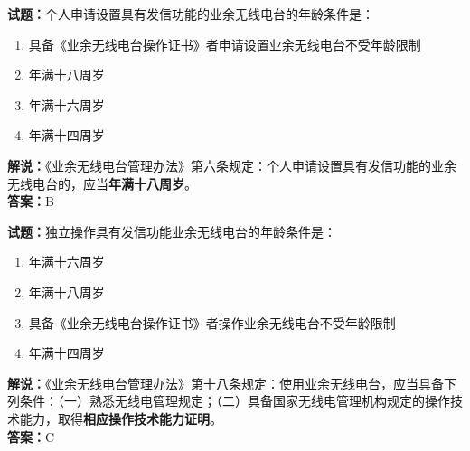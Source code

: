 \documentclass{ctexbook}
\begin{document}
\vspace{\baselineskip}

\noindent\textbf{试题：}个人申请设置具有发信功能的业余无线电台的年龄条件是：
\begin{enumerate}[leftmargin=3em]
  \item 具备《业余无线电台操作证书》者申请设置业余无线电台不受年龄限制
  \item 年满十八周岁
  \item 年满十六周岁
  \item 年满十四周岁
\end{enumerate}
\noindent\textbf{解说：}《业余无线电台管理办法》第六条规定：个人申请设置具有发信功能的业余无线电台的，应当\textbf{年满十八周岁}。\\\noindent\textbf{答案：}B

\vspace{\baselineskip}

\noindent\textbf{试题：}独立操作具有发信功能业余无线电台的年龄条件是：
\begin{enumerate}[leftmargin=3em]
  \item 年满十六周岁
  \item 年满十八周岁
  \item 具备《业余无线电台操作证书》者操作业余无线电台不受年龄限制
  \item 年满十四周岁
\end{enumerate}
\noindent\textbf{解说：}《业余无线电台管理办法》第十八条规定：使用业余无线电台，应当具备下列条件：（一）熟悉无线电管理规定；（二）具备国家无线电管理机构规定的操作技术能力，取得\textbf{相应操作技术能力证明}。\\\noindent\textbf{答案：}C

\vspace{\baselineskip}
\end{document}
